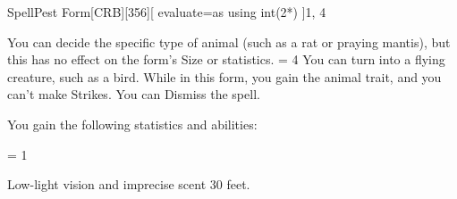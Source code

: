 
\begin{card-collection}{Spell}{\level}{Pest Form}[CRB][356]{\level}[
  evaluate=\level as \dice using int(2*\level)
]{1, 4}





You can decide the specific type of animal (such as a rat or praying mantis), but this has no effect on the form's Size or statistics. 
\ifnum \level = 4
You can turn into a flying creature, such as a bird.
\fi
While in this form, you gain the animal trait, and you can't make Strikes. You can Dismiss the spell.

You gain the following statistics and abilities:

\ifnum \level = 1
\else
{}
\fi


Low-light vision and imprecise scent 30 feet.

\end{card-collection}